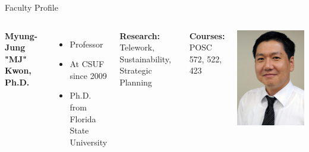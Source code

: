 \documentclass[10pt]{beamer}
\newlength{\imageheight}
\begin{document}
        \begin{frame}{Faculty Profile}
        \begin{columns}[t]
        \textbf{Myung-Jung "MJ" Kwon, Ph.D.}
        \begin{itemize}
        \item Professor
        \item At CSUF since 2009
        \item Ph.D. from Florida State University
        \end{itemize}
        
        \textbf{Research:} Telework, Sustainability, Strategic Planning
        
        \textbf{Courses:} POSC 572, 522, 423
        
        \vspace*{0.5cm}
        \includegraphics[height=\imageheight]{images/kwon.jpg}
        \end{columns}
        \end{frame}
        
\end{document}

